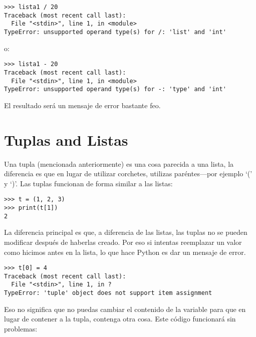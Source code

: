 \begin{listing}
\begin{verbatim}
>>> lista1 / 20
Traceback (most recent call last):
  File "<stdin>", line 1, in <module>
TypeError: unsupported operand type(s) for /: 'list' and 'int'
\end{verbatim}
\end{listing}

\noindent
o:

\begin{listing}
\begin{verbatim}
>>> lista1 - 20
Traceback (most recent call last):
  File "<stdin>", line 1, in <module>
TypeError: unsupported operand type(s) for -: 'type' and 'int'
\end{verbatim}
\end{listing}

\noindent
El resultado será un mensaje de error bastante feo.

\section{Tuplas and Listas}\label{tuplesandlists}

Una tupla (mencionada anteriormente) es una cosa parecida a una lista, la diferencia es que en lugar de utilizar corchetes, utilizas paréntes---por ejemplo `(' y `)'. Las tuplas funcionan de forma similar a las listas:

\begin{listing}
\begin{verbatim}
>>> t = (1, 2, 3)
>>> print(t[1])
2
\end{verbatim}
\end{listing}

La diferencia principal es que, a diferencia de las listas, las tuplas no se pueden modificar después de haberlas creado. Por eso si intentas reemplazar un valor como hicimos antes en la lista, lo que hace Python es dar un mensaje de error.

\begin{listing}
\begin{verbatim}
>>> t[0] = 4
Traceback (most recent call last):
  File "<stdin>", line 1, in ?
TypeError: 'tuple' object does not support item assignment
\end{verbatim}
\end{listing}

Eso no significa que no puedas cambiar el contenido de la variable para que en lugar de contener a la tupla, contenga otra cosa. Este código funcionará sin problemas:

